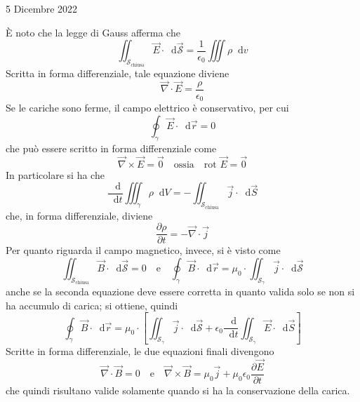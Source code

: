\documentclass[a4paper]{extarticle}
\newcommand\dif{\mathop{}\!\mathrm{d}}
\begin{document}
\newpage
\noindent
\begin{center}
  5 Dicembre 2022
\end{center}
È noto che la legge di Gauss afferma che
\[\iint_{\mathcal{S}_\text{chiusa}} \vec E \cdot \dif \vec{\mathcal{S}} = \dfrac{1}{\epsilon_0} \iiint \rho \dif v\]
Scritta in forma differenziale, tale equazione diviene
\[\vec \nabla \cdot \vec E = \dfrac{\rho}{\epsilon_0}\]
Se le cariche sono ferme, il campo elettrico è conservativo, per cui
\[\oint_\gamma \vec E \cdot \dif \vec r = 0\]
che può essere scritto in forma differenziale come
\[\vec \nabla \times \vec E = \vec 0 \hspace{1em} \text{ossia} \hspace{1em} \text{rot } \vec E = \vec 0\]
In particolare si ha che
\[\dfrac{\dif}{\dif t} \iiint_\gamma \rho \dif V = - \iint_{\mathcal{S}_\text{chiusa}} \vec j \cdot \dif \vec S\]
che, in forma differenziale, diviene
\[\dfrac{\partial \rho}{\partial t} = - \vec \nabla \cdot \vec j\]
Per quanto riguarda il campo magnetico, invece, si è visto come
\[\iint_{\mathcal{S}_\text{chiusa}} \vec B \cdot \dif \vec{\mathcal{S}} = 0 \hspace{1em} \text{e} \hspace{1em} \oint_\gamma \vec B \cdot \dif \vec r = \mu_0 \cdot \iint_{\mathcal{S}_\gamma} \vec j \cdot \dif \vec{\mathcal{S}}\]
anche se la seconda equazione deve essere corretta in quanto valida solo se non si ha accumulo di carica; si ottiene, quindi
\[\oint_\gamma \vec B \cdot \dif \vec r = \mu_0 \cdot \left[\iint_{\mathcal{S}_\gamma} \vec j \cdot \dif \vec{\mathcal{S}} + \epsilon_0 \dfrac{\dif}{\dif t} \iint_{\mathcal{S}_\gamma} \vec E \cdot \dif \vec S\right]\]
Scritte in forma differenziale, le due equazioni finali divengono
\[\vec \nabla \cdot \vec B = 0 \hspace{1em} \text{e} \hspace{1em} \vec \nabla \times \vec B = \mu_0 \vec j + \mu_0 \epsilon_0 \dfrac{\partial \vec E}{\partial t}\]
che quindi risultano valide solamente quando si ha la conservazione della carica.

\newpage
\noindent
\end{document}
